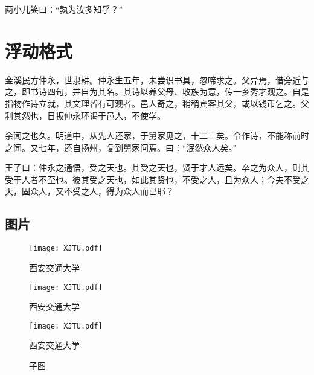 \documentclass[
    bachelor, 
    pdflinks,
    ]{xjtuthesis}
\begin{document}
                    两小儿笑曰：“孰为汝多知乎？”

    \chapter{浮动格式}

        金溪民方仲永，世隶耕。仲永生五年，未尝识书具，忽啼求之。父异焉，借旁近与之，即书诗四句，并自为其名。其诗以养父母、收族为意，传一乡秀才观之。自是指物作诗立就，其文理皆有可观者。邑人奇之，稍稍宾客其父，或以钱币乞之。父利其然也，日扳仲永环谒于邑人，不使学。

        余闻之也久。明道中，从先人还家，于舅家见之，十二三矣。令作诗，不能称前时之闻。又七年，还自扬州，复到舅家问焉。曰：“泯然众人矣。”

        王子曰：仲永之通悟，受之天也。其受之天也，贤于才人远矣。卒之为众人，则其受于人者不至也。彼其受之天也，如此其贤也，不受之人，且为众人；今夫不受之天，固众人，又不受之人，得为众人而已耶？

        \section{图片}

            \begin{figure}[h!]
              \centering
              \texttt{[image: XJTU.pdf]}
              \caption{西安交通大学}
              \label{fig:xjtu}
            \end{figure}
 
            \begin{figure}[h!]
              \begin{minipage}{0.45\textwidth}
                  \centering
                  \texttt{[image: XJTU.pdf]}
                  \caption{西安交通大学}
                  \label{fig:xjtu-left}
              \end{minipage}
              \begin{minipage}{0.45\textwidth}
                  \centering
                  \texttt{[image: XJTU.pdf]}
                  \caption{西安交通大学}
                  \label{fig:xjtu-right}
              \end{minipage}
            \end{figure}
              
            \begin{figure}[h!]
              \centering
              \caption{子图}
            \end{figure}
              
\end{document}
